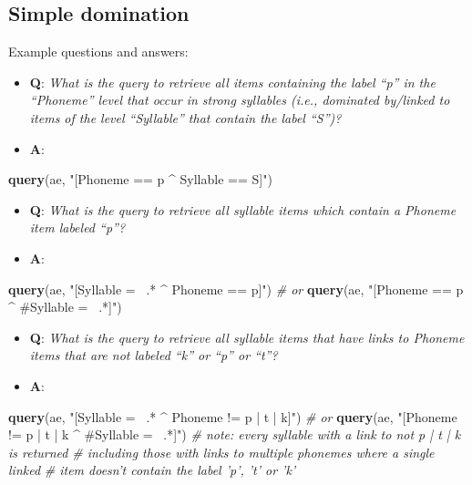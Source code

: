 \documentclass[]{book}
\newenvironment{Shaded}{\begin{snugshade}}{\end{snugshade}}
\newcommand{\CommentTok}[1]{\textcolor[rgb]{0.56,0.35,0.01}{\textit{#1}}}
\newcommand{\KeywordTok}[1]{\textcolor[rgb]{0.13,0.29,0.53}{\textbf{#1}}}
\newcommand{\NormalTok}[1]{#1}
\newcommand{\StringTok}[1]{\textcolor[rgb]{0.31,0.60,0.02}{#1}}
\providecommand{\tightlist}{%
  \setlength{\itemsep}{0pt}\setlength{\parskip}{0pt}}
\begin{document}
\hypertarget{simple-domination}{%
\subsection{Simple domination}\label{simple-domination}}

Example questions and answers:

\begin{itemize}
\tightlist
\item
  \textbf{Q}: \emph{What is the query to retrieve all items containing the label ``p'' in the ``Phoneme'' level that occur in strong syllables (i.e., dominated by/linked to items of the level ``Syllable'' that contain the label ``S'')?}
\item
  \textbf{A}:
\end{itemize}

\begin{Shaded}
\begin{Highlighting}[]
\KeywordTok{query}\NormalTok{(ae, }\StringTok{"[Phoneme == p ^ Syllable == S]"}\NormalTok{)}
\end{Highlighting}
\end{Shaded}

\begin{itemize}
\tightlist
\item
  \textbf{Q}: \emph{What is the query to retrieve all syllable items which contain a Phoneme item labeled ``p''?}
\item
  \textbf{A}:
\end{itemize}

\begin{Shaded}
\begin{Highlighting}[]
\KeywordTok{query}\NormalTok{(ae, }\StringTok{"[Syllable =~ .* ^ Phoneme == p]"}\NormalTok{) }
\CommentTok{# or }
\KeywordTok{query}\NormalTok{(ae, }\StringTok{"[Phoneme == p ^ #Syllable =~ .*]"}\NormalTok{)}
\end{Highlighting}
\end{Shaded}

\begin{itemize}
\tightlist
\item
  \textbf{Q}: \emph{What is the query to retrieve all syllable items that have links to Phoneme items that are not labeled ``k'' or ``p'' or ``t''?}
\item
  \textbf{A}:
\end{itemize}

\begin{Shaded}
\begin{Highlighting}[]
\KeywordTok{query}\NormalTok{(ae, }\StringTok{"[Syllable =~ .* ^ Phoneme != p | t | k]"}\NormalTok{)}
\CommentTok{# or }
\KeywordTok{query}\NormalTok{(ae, }\StringTok{"[Phoneme != p | t | k ^ #Syllable =~ .*]"}\NormalTok{)}
\CommentTok{# note: every syllable with a link to not p | t | k is returned}
\CommentTok{# including those with links to multiple phonemes where a single linked}
\CommentTok{# item doesn't contain the label 'p', 't' or 'k'}
\end{Highlighting}
\end{Shaded}
\end{document}
